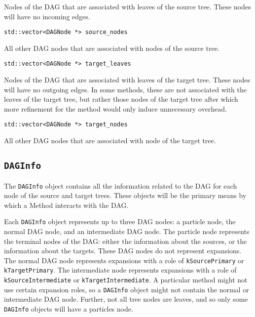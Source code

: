\noindent Nodes of the DAG that are associated with leaves of the source tree.
These nodes will have no incoming edges.

\begin{lstlisting}
std::vector<DAGNode *> source_nodes
\end{lstlisting}

\noindent All other DAG nodes that are associated with nodes of the source tree.

\begin{lstlisting}
std::vector<DAGNode *> target_leaves
\end{lstlisting}

\noindent Nodes of the DAG that are associated with leaves of the target tree.
These nodes will have no outgoing edges. In some methods, these are not
associated with the leaves of the target tree, but rather those nodes of the
target tree after which more refinement for the method would only induce
unnecessary overhead.

\begin{lstlisting}
std::vector<DAGNode *> target_nodes
\end{lstlisting}

\noindent All other DAG nodes that are associated with node of the target tree.



\subsection{\texttt{DAGInfo}}

The \texttt{DAGInfo} object contains all the information related to the DAG
for each node of the source and target trees. These objects will be the
primary means by which a Method interacts with the DAG.

Each \texttt{DAGInfo} object represents up to three DAG nodes: a particle
node, the normal DAG node, and an intermediate DAG node. The particle node
represents the terminal nodes of the DAG: either the information about
the sources, or the information about the targets. These DAG nodes do not
represent expansions. The normal
DAG node represents expansions with a role of \texttt{kSourcePrimary} or
\texttt{kTargetPrimary}. The intermediate node represents expansions with a
role of \texttt{kSourceIntermediate} or \texttt{kTargetIntermediate}. A
particular method might not use certain expansion roles, so a
\texttt{DAGInfo} object might not contain the normal or intermediate DAG node.
Further, not all tree nodes are leaves, and so only some \texttt{DAGInfo}
objects will have a particles node.

